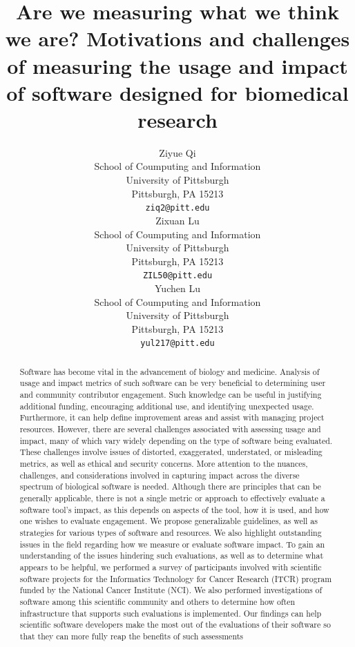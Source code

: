 \documentclass{article}
\title{Are we measuring what we think we are? Motivations and challenges of measuring the usage and impact of software designed for biomedical research}
\author{
 Ziyue Qi \\
  School of Coumputing and Information\\
  University of Pittsburgh\\
  Pittsburgh, PA 15213 \\
  \texttt{ziq2@pitt.edu} \\
   \And
 Zixuan Lu \\
  School of Coumputing and Information\\
  University of Pittsburgh\\
  Pittsburgh, PA 15213 \\
  \texttt{ZIL50@pitt.edu} \\
  \And
 Yuchen Lu \\
  School of Coumputing and Information\\
  University of Pittsburgh\\
  Pittsburgh, PA 15213 \\
  \texttt{yul217@pitt.edu} \\
}
\begin{document}
\maketitle
\begin{abstract}
Software has become vital in the advancement of biology and medicine. Analysis of usage and impact metrics of such software can be very beneficial to determining user and community contributor engagement. Such knowledge can be useful in justifying additional funding, encouraging additional use, and identifying unexpected usage. Furthermore, it can help define improvement areas and assist with managing project resources. However, there are several challenges associated with assessing usage and impact, many of which vary widely depending on the type of software being evaluated. These challenges involve issues of distorted, exaggerated, understated, or misleading metrics, as well as ethical and security concerns.  More attention to the nuances, challenges, and considerations involved in capturing impact across the diverse spectrum of biological software is needed. Although there are principles that can be generally applicable, there is not a single metric or approach to effectively evaluate a software tool’s impact, as this depends on aspects of the tool, how it is used, and how one wishes to evaluate engagement. We propose generalizable guidelines, as well as strategies for various types of software and resources. We also highlight outstanding issues in the field regarding how we measure or evaluate software impact. To gain an understanding of the issues hindering such evaluations, as well as to determine what appears to be helpful, we performed a survey of participants involved with scientific software projects for the Informatics Technology for Cancer Research (ITCR) program funded by the National Cancer Institute (NCI). We also performed investigations of software among this scientific community and others to determine how often infrastructure that supports such evaluations is implemented.  Our findings can help scientific software developers make the most out of the evaluations of their software so that they can more fully reap the benefits of such assessments
\end{abstract}


\end{document}
